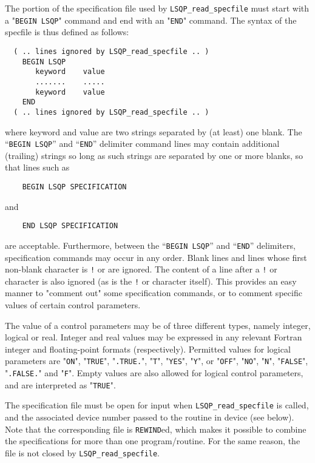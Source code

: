 \documentclass{galahad}
\newcommand{\packagename}{LSQP}
\begin{document}
The portion of the specification file used by 
{\tt \packagename\_read\_specfile}
must start
with a "{\tt BEGIN \packagename}" command and end with an 
"{\tt END}" command.  The syntax of the specfile is thus defined as follows:
\begin{verbatim}
  ( .. lines ignored by LSQP_read_specfile .. )
    BEGIN LSQP
       keyword    value
       .......    .....
       keyword    value
    END 
  ( .. lines ignored by LSQP_read_specfile .. )
\end{verbatim}
where keyword and value are two strings separated by (at least) one blank.
The ``{\tt BEGIN \packagename}'' and ``{\tt END}'' delimiter command lines 
may contain additional (trailing) strings so long as such strings are 
separated by one or more blanks, so that lines such as
\begin{verbatim}
    BEGIN LSQP SPECIFICATION
\end{verbatim}
and
\begin{verbatim}
    END LSQP SPECIFICATION
\end{verbatim}
are acceptable. Furthermore, 
between the
``{\tt BEGIN \packagename}'' and ``{\tt END}'' delimiters,
specification commands may occur in any order.  Blank lines and
lines whose first non-blank character is {\tt !} or {\tt *} are ignored. 
The content 
of a line after a {\tt !} or {\tt *} character is also 
ignored (as is the {\tt !} or {\tt *}
character itself). This provides an easy manner to "comment out" some 
specification commands, or to comment specific values 
of certain control parameters.  

The value of a control parameters may be of three different types, namely
integer, logical or real.
Integer and real values may be expressed in any relevant Fortran integer and
floating-point formats (respectively). Permitted values for logical
parameters are "{\tt ON}", "{\tt TRUE}", "{\tt .TRUE.}", "{\tt T}", 
"{\tt YES}", "{\tt Y}", or "{\tt OFF}", "{\tt NO}",
"{\tt N}", "{\tt FALSE}", "{\tt .FALSE.}" and "{\tt F}". 
Empty values are also allowed for 
logical control parameters, and are interpreted as "{\tt TRUE}".  

The specification file must be open for 
input when {\tt \packagename\_read\_specfile}
is called, and the associated device number 
passed to the routine in device (see below). 
Note that the corresponding 
file is {\tt REWIND}ed, which makes it possible to combine the specifications 
for more than one program/routine.  For the same reason, the file is not
closed by {\tt \packagename\_read\_specfile}.
\end{document}
